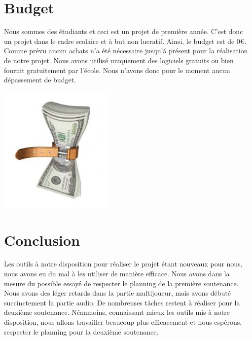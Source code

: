 \documentclass[a4paper, 12pt]{article}
\begin{document}
\section{Budget}

Nous sommes des étudiants et ceci est un projet de première année. C'est donc un projet dans le cadre scolaire et à but non lucratif. Ainsi, le budget est de 0\euro{}. Comme prévu aucun achats n'a été nécessaire jusqu'\'a présent pour la réalisation de notre projet. Nous avons utilisé uniquement des logiciels gratuits ou bien fournit gratuitement par l'école. Nous n'avons donc pour le moment aucun dépassement de budget.\\

\centerline{\includegraphics[scale=0.7]{images.jpg}}

\section{Conclusion}

Les outils à notre disposition pour réaliser le projet étant  nouveaux pour nous, nous avons eu du mal à les utiliser de manière efficace. Nous avons dans la mesure du possible essayé de respecter le planning de la première soutenance. Nous avons des l\'eger retards dans la partie multijoueur, mais avons d\'ebut\'e succinctement la partie audio. De nombreuses tâches restent à réaliser pour la deuxième soutenance. Néanmoins, connaissant mieux les outils mis à notre disposition, nous allons travailler beaucoup plus efficacement et nous espérons, respecter le planning pour la deuxième soutenance. 
\end{document}
